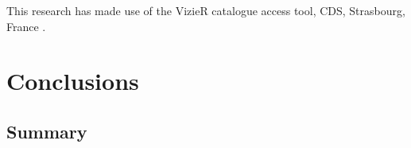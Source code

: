 \documentclass[12pt]{article}
\begin{document}
This research has made use of the VizieR catalogue access tool, CDS, Strasbourg, France \citep[DOI: 10.26093/cds/vizier;][]{vizier}.






\newpage
\section{Conclusions}
\label{conc}
\subsection{Summary}
\end{document}
